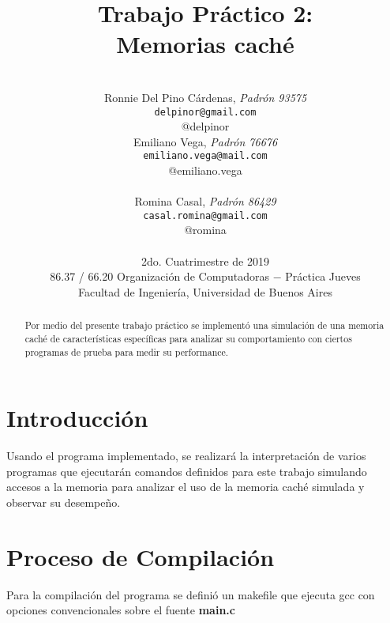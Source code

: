 \documentclass[a4paper, 10pt, twoside, notitlepage]{article}
\title{\textbf{Trabajo Práctico 2:\\Memorias caché} \\}
\author{ \\
         Ronnie Del Pino Cárdenas, \textit{Padrón 93575} \\
          \texttt{ delpinor@gmail.com }       \\
          @delpinor \\
		  [2.5ex]
         Emiliano Vega, \textit{Padrón 76676}     \\
          \texttt{emiliano.vega@mail.com}   \\
          @emiliano.vega   \\                 \\ 
		  [2.5ex]
	 Romina Casal, \textit{Padrón 86429} \\
          \texttt{casal.romina@gmail.com} \\
          @romina
                               \\ 
		  [2.5ex]
		 \\
         \normalsize{2do. Cuatrimestre de 2019}            \\
         \normalsize{86.37 / 66.20 Organización de Computadoras $-$ Práctica Jueves} \\
         \normalsize{Facultad de Ingeniería, Universidad de Buenos Aires} 
       }
\date{}
\begin{document}
\maketitle

\begin{abstract}
Por medio del presente trabajo práctico se implementó una simulación de una memoria caché de características específicas para analizar su comportamiento con ciertos programas de prueba para medir su performance.

\end{abstract}

% 
% 

\pagestyle{fancy}
\fancyhead{}
\fancyfoot{}
\renewcommand{\sectionmark}[1]{\markright{\thesection\ #1}}
\renewcommand{\headrulewidth}{0.4pt}
\fancyhead[LE]{\nouppercase \rightmark}
\fancyhead[RE, LO]{\bf \thepage}
\fancyhead[RO]{\nouppercase \rightmark}
\fancyfoot[C]{ }
\maketitle
\setcounter{page}{1}

\parskip 7.2pt
\section{Introducción}
Usando el programa implementado, se realizará la interpretación de varios programas que ejecutarán comandos definidos para este trabajo simulando accesos a la memoria para analizar el uso de la memoria caché simulada y observar su desempeño.\\



\section{Proceso de Compilación}
Para la compilación del programa se definió un makefile que ejecuta gcc con opciones convencionales sobre el fuente \textbf{main.c}\\
\end{document}
